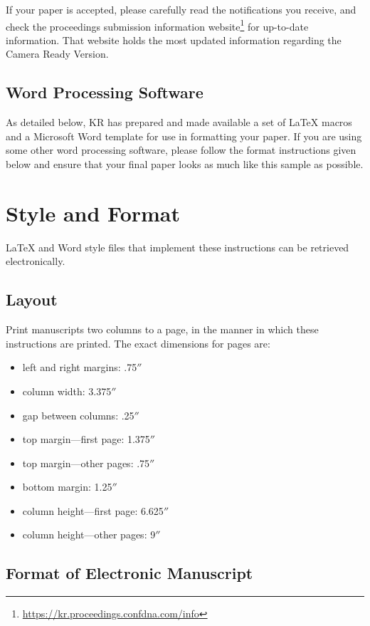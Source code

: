 \documentclass{article}
\begin{document}
If your paper is accepted, please carefully read the notifications you receive,
and check the proceedings submission information
website\footnote{\url{https://kr.proceedings.confdna.com/info}} for up-to-date
information. That website holds the most updated information regarding the
Camera Ready Version.

\subsection{Word Processing Software}

As detailed below, KR has prepared and made available a set of
\LaTeX{} macros and a Microsoft Word template for use in formatting
your paper. If you are using some other word processing software, please follow the format instructions given below and ensure that your final paper looks as much like this sample as possible.

\section{Style and Format}

\LaTeX{} and Word style files that implement these instructions
can be retrieved electronically.

\subsection{Layout}

Print manuscripts two columns to a page, in the manner in which these
instructions are printed. The exact dimensions for pages are:
\begin{itemize}
\item left and right margins: .75$''$
\item column width: 3.375$''$
\item gap between columns: .25$''$
\item top margin---first page: 1.375$''$
\item top margin---other pages: .75$''$
\item bottom margin: 1.25$''$
\item column height---first page: 6.625$''$
\item column height---other pages: 9$''$
\end{itemize}


\subsection{Format of Electronic Manuscript}
\end{document}
